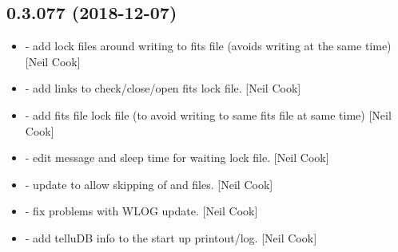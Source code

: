 \documentclass[a4paper,10pt,english]{report}
\begin{document}
\subsection{0.3.077 (2018-12-07)}
\label{\detokenize{misc/changelog:id246}}\begin{itemize}
\item {} 
 - add lock files around writing to fits file (avoids
writing at the same time) {[}Neil Cook{]}

\item {} 
 - add links to check/close/open fits lock
file. {[}Neil Cook{]}

\item {} 
 - add fits file lock file (to avoid writing to same fits
file at same time) {[}Neil Cook{]}

\item {} 
 - edit message and sleep time for waiting lock file. {[}Neil
Cook{]}

\item {} 
 - update to allow skipping of  and 
files. {[}Neil Cook{]}

\item {} 
 - fix problems with WLOG update. {[}Neil Cook{]}

\item {} 
 - add telluDB info to the start up printout/log.
{[}Neil Cook{]}

\end{itemize}
\end{document}
